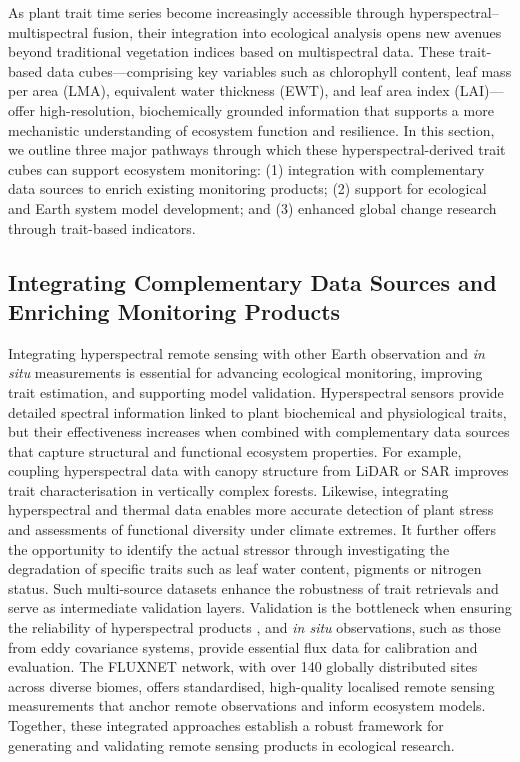\documentclass[pdflatex,sn-mathphys-num]{sn-jnl}%
\theoremstyle{thmstyleone}%
\theoremstyle{thmstyletwo}%
\theoremstyle{thmstylethree}%
\begin{document}
As plant trait time series become increasingly accessible through hyperspectral–multispectral fusion, their integration into ecological analysis opens new avenues beyond traditional vegetation indices based on multispectral data. These trait-based data cubes—comprising key variables such as chlorophyll content, leaf mass per area (LMA), equivalent water thickness (EWT), and leaf area index (LAI)—offer high-resolution, biochemically grounded information that supports a more mechanistic understanding of ecosystem function and resilience. In this section, we outline three major pathways through which these hyperspectral-derived trait cubes can support ecosystem monitoring: (1) integration with complementary data sources to enrich existing monitoring products; (2) support for ecological and Earth system model development; and (3) enhanced global change research through trait-based indicators.


\subsection{Integrating Complementary Data Sources and Enriching Monitoring Products}\label{subsec1}

Integrating hyperspectral remote sensing with other Earth observation and \textit{in situ} measurements is essential for advancing ecological monitoring, improving trait estimation, and supporting model validation. Hyperspectral sensors provide detailed spectral information linked to plant biochemical and physiological traits, but their effectiveness increases when combined with complementary data sources that capture structural and functional ecosystem properties. For example, coupling hyperspectral data with canopy structure from LiDAR or SAR improves trait characterisation in vertically complex forests. Likewise, integrating hyperspectral and thermal data enables more accurate detection of plant stress and assessments of functional diversity under climate extremes. It further offers the opportunity to identify the actual stressor through investigating the degradation of specific traits such as leaf water content, pigments or nitrogen status. Such multi-source datasets enhance the robustness of trait retrievals and serve as intermediate validation layers. Validation is the bottleneck when ensuring the reliability of hyperspectral products \citep{cherif2023spectra,mederer2025plant}, and \textit{in situ} observations, such as those from eddy covariance systems, provide essential flux data for calibration and evaluation. The FLUXNET network, with over 140 globally distributed sites across diverse biomes, offers standardised, high-quality localised remote sensing measurements that anchor remote observations and inform ecosystem models. Together, these integrated approaches establish a robust framework for generating and validating remote sensing products in ecological research.
\end{document}
